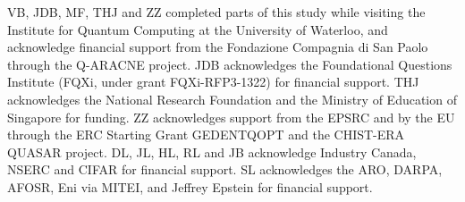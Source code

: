 \documentclass[aps,prx,10pt,
               superscriptaddress,
               twocolumn,
               longbibliography,
showpacs]{revtex4-1}
\theoremstyle{plain}
\theoremstyle{definition}
\begin{document}
\begin{acknowledgments}
VB, JDB, MF, THJ and ZZ completed parts of this study
while visiting the Institute for Quantum Computing at the University of Waterloo,
and acknowledge financial support from the Fondazione Compagnia di San Paolo
through the Q-ARACNE project.  JDB acknowledges the Foundational Questions
Institute (FQXi, under grant FQXi-RFP3-1322) for financial support. THJ
acknowledges the National Research Foundation and the Ministry of Education of
Singapore for funding. ZZ acknowledges support from the EPSRC and by the EU
through the ERC Starting Grant GEDENTQOPT and the CHIST-ERA QUASAR project. DL, JL, HL, 
RL  and JB acknowledge Industry Canada, NSERC and CIFAR for financial support.
SL acknowledges the ARO, DARPA, AFOSR, Eni via MITEI, and
Jeffrey Epstein for financial support.
\end{acknowledgments}


\end{document}

